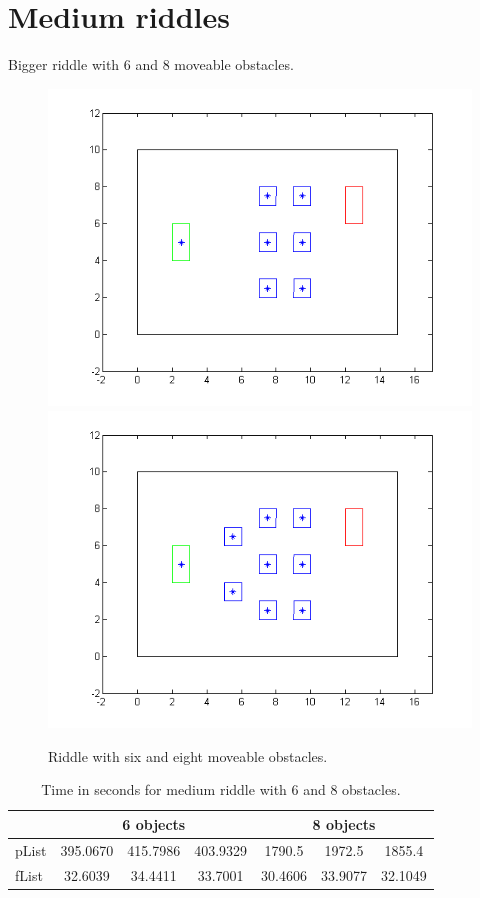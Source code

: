 \section{Medium riddles}
Bigger riddle with 6 and 8 moveable obstacles.\\
\begin{figure}[H]
\includegraphics[scale = 0.5]{riddle6}
\includegraphics[scale = 0.5]{riddle8}
\caption{Riddle with six and eight moveable obstacles.}
\end{figure}
\begin{table}[H]
\centering
\begin{tabular}{l||c|c|c||c|c|c}
& \multicolumn{3}{c||}{6 objects} &\multicolumn{3}{c}{8 objects}\\\hline\hline
pList &  395.0670 & 415.7986 & 403.9329  & 1790.5 &1972.5 &1855.4\\
fList  &  32.6039 &  34.4411 & 33.7001 & 30.4606 & 33.9077 & 32.1049\\
\end{tabular}
\caption{Time in seconds for medium riddle with 6 and 8 obstacles.}
\end{table}

